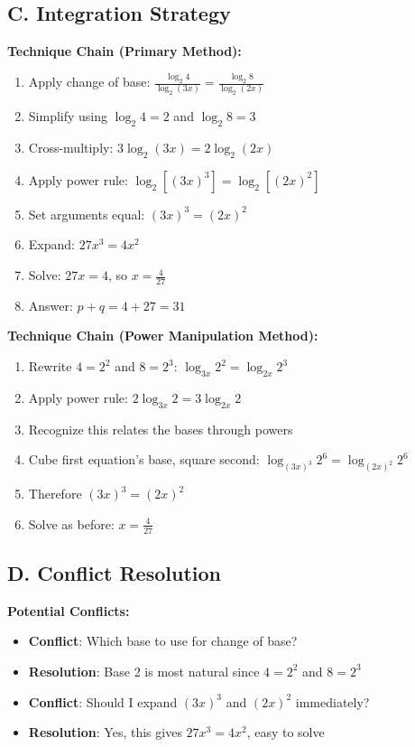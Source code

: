 \documentclass[12pt]{article}
\begin{document}
\begin{conversionbox}
\subsection*{C. Integration Strategy}

\textbf{Technique Chain (Primary Method):}
\begin{enumerate}
    \item Apply change of base: $\frac{\log_2 4}{\log_2(3x)} = \frac{\log_2 8}{\log_2(2x)}$
    \item Simplify using $\log_2 4 = 2$ and $\log_2 8 = 3$
    \item Cross-multiply: $3\log_2(3x) = 2\log_2(2x)$
    \item Apply power rule: $\log_2[(3x)^3] = \log_2[(2x)^2]$
    \item Set arguments equal: $(3x)^3 = (2x)^2$
    \item Expand: $27x^3 = 4x^2$
    \item Solve: $27x = 4$, so $x = \frac{4}{27}$
    \item Answer: $p + q = 4 + 27 = 31$
\end{enumerate}

\textbf{Technique Chain (Power Manipulation Method):}
\begin{enumerate}
    \item Rewrite $4 = 2^2$ and $8 = 2^3$: $\log_{3x} 2^2 = \log_{2x} 2^3$
    \item Apply power rule: $2\log_{3x} 2 = 3\log_{2x} 2$
    \item Recognize this relates the bases through powers
    \item Cube first equation's base, square second: $\log_{(3x)^3} 2^6 = \log_{(2x)^2} 2^6$
    \item Therefore $(3x)^3 = (2x)^2$
    \item Solve as before: $x = \frac{4}{27}$
\end{enumerate}

\subsection*{D. Conflict Resolution}

\textbf{Potential Conflicts:}
\begin{itemize}
    \item \textbf{Conflict}: Which base to use for change of base?
    \item \textbf{Resolution}: Base 2 is most natural since $4=2^2$ and $8=2^3$
    \item \textbf{Conflict}: Should I expand $(3x)^3$ and $(2x)^2$ immediately?
    \item \textbf{Resolution}: Yes, this gives $27x^3 = 4x^2$, easy to solve
\end{itemize}
\end{conversionbox}
\end{document}
